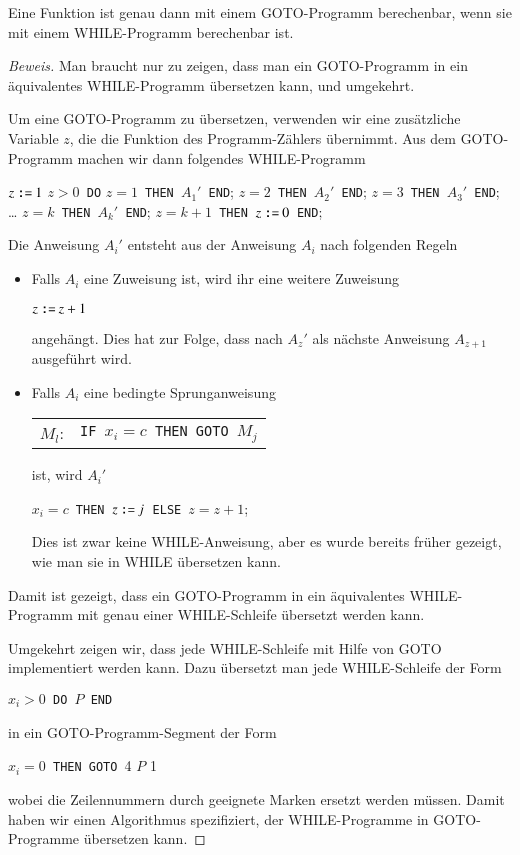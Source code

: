 \begin{satz}
Eine Funktion ist genau dann mit einem GOTO-Programm berechenbar,
wenn sie mit einem WHILE-Programm berechenbar ist.
\end{satz}
\begin{proof}[Beweis]
Man braucht nur zu zeigen, dass man ein GOTO-Programm in ein äquivalentes
WHILE-Programm übersetzen kann, und umgekehrt.

Um eine GOTO-Programm zu übersetzen, verwenden wir eine zusätzliche Variable
$z$, die die Funktion des Programm-Zählers übernimmt.
Aus dem GOTO-Programm machen wir dann folgendes WHILE-Programm
\begin{algorithmic}
\STATE $z \mathbin{\texttt{:=}} 1$
$z>0${\tt\ DO}
$z=1${\tt\ THEN\ }$A_1'${\tt\ END};
$z=2${\tt\ THEN\ }$A_2'${\tt\ END};
$z=3${\tt\ THEN\ }$A_3'${\tt\ END};
\STATE\dots
{}$z=k${\tt\ THEN\ }$A_k'${\tt\ END};
$z=k+1${\tt\ THEN\ }$z \mathbin{\texttt{:=}} 0${\tt\ END};
\end{algorithmic}
Die Anweisung $A_i'$ entsteht aus der Anweisung $A_i$ nach folgenden
Regeln
\begin{itemize}
\item Falls $A_i$ eine Zuweisung ist, wird ihr eine weitere Zuweisung
\begin{algorithmic}
\STATE $z \mathbin{\texttt{:=}} z+1$
\end{algorithmic}
angehängt.
Dies hat zur Folge, dass nach $A_z'$ als nächste Anweisung
$A_{z+1}$ ausgeführt wird.
\item
Falls $A_i$ eine bedingte Sprunganweisung
\begin{center}
\begin{tabular}{rl}
$M_l$:&{\tt IF\ }$x_i=c${\tt\ THEN GOTO\ }$M_j$
\end{tabular}
\end{center}
ist, wird $A_i'$
\begin{algorithmic}
$x_i=c${\tt\ THEN\ }$z \mathbin{\texttt{:=}} j${\tt\ ELSE }$z=z+1$;
\end{algorithmic}
Dies ist zwar keine WHILE-Anweisung, aber es wurde bereits
früher gezeigt, wie man sie in WHILE übersetzen kann.
\end{itemize}
Damit ist gezeigt, dass ein GOTO-Programm in ein äquivalentes WHILE-Programm
mit genau einer WHILE-Schleife übersetzt werden kann.

Umgekehrt zeigen wir, dass jede WHILE-Schleife mit Hilfe von GOTO
implementiert werden kann.
Dazu übersetzt man jede WHILE-Schleife der Form
\begin{algorithmic}
$x_i>0${\tt\ DO }$P${\tt\ END}
\end{algorithmic}
in ein GOTO-Programm-Segment der Form
\begin{algorithmic}[1]
$x_i=0${\tt\ THEN GOTO }4
\STATE$P$
1
\STATE
\end{algorithmic}
wobei die Zeilennummern durch geeignete Marken ersetzt werden müssen.
Damit haben wir einen Algorithmus spezifiziert, der WHILE-Programme in
GOTO-Programme übersetzen kann.
\end{proof}


